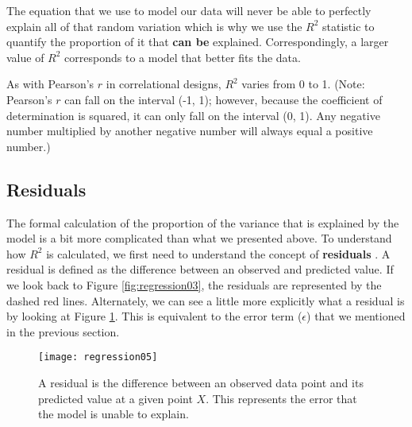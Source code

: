 The equation that we use to model our data will never be able to perfectly explain all of that random variation which is why we use the $R^2$ statistic to quantify the proportion of it that \textbf{can be} explained. Correspondingly, a larger value of $R^2$ corresponds to a model that better fits the data.

As with Pearson's $r$  in correlational designs, $R^2$ varies from 0 to 1. (Note: Pearson's $r$ can fall on the interval (-1, 1); however, because the coefficient of determination is squared, it can only fall on the interval (0, 1). Any negative number multiplied by another negative number will always equal a positive number.)

\subsection{Residuals}

The formal calculation of the proportion of the variance that is explained by the model is a bit more complicated than what we presented above. To understand how $R^2$ is calculated, we first need to understand the concept of \textbf{residuals} . A residual is defined as the difference between an observed and predicted value. If we look back to Figure \ref{fig:regression03}, the residuals are represented by the dashed red lines. Alternately, we can see a little more explicitly what a residual is by looking at Figure \ref{fig:regression05}. This is equivalent to the error term ($\epsilon$) that we mentioned in the previous section.

\begin{figure}[htp]
\texttt{[image: regression05]}
\caption{A residual is the difference between an observed data point and its predicted value at a given point $X$. This represents the error that the model is unable to explain.}
\label{fig:regression05}
\end{figure}

